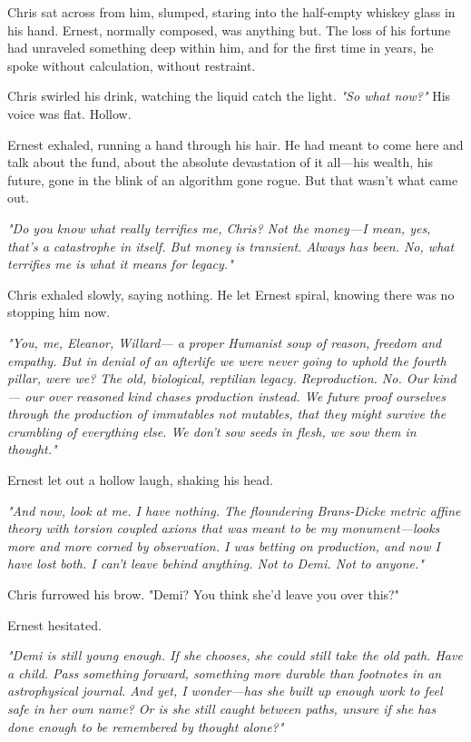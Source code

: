 Chris sat across from him, slumped, staring into the half-empty whiskey glass in his hand. Ernest, normally composed, was anything but. The loss of his fortune had unraveled something deep within him, and for the first time in years, he spoke without calculation, without restraint.

Chris swirled his drink, watching the liquid catch the light. \textit{"So what now?"} His voice was flat. Hollow.

Ernest exhaled, running a hand through his hair. He had meant to come here and talk about the fund, about the absolute devastation of it all—his wealth, his future, gone in the blink of an algorithm gone rogue. But that wasn’t what came out.

\textit{"Do you know what really terrifies me, Chris? Not the money—I mean, yes, that’s a catastrophe in itself. But money is transient. Always has been. No, what terrifies me is what it means for legacy."}

Chris exhaled slowly, saying nothing. He let Ernest spiral, knowing there was no stopping him now.

\textit{"You, me, Eleanor, Willard— a proper Humanist soup of reason, freedom and empathy. But in denial of an afterlife we were never going to uphold the fourth pillar, were we? The old, biological, reptilian legacy. Reproduction. No. Our kind— our over reasoned kind chases production instead. We future proof ourselves through the production of immutables not mutables, that they might survive the crumbling of everything else. We don't sow seeds in flesh, we sow them in thought."}

Ernest let out a hollow laugh, shaking his head.

\textit{"And now, look at me. I have nothing. The floundering Brans-Dicke metric affine theory with torsion coupled axions that was meant to be my monument—looks more and more corned by observation. I was betting on production, and now I have lost both. I can't leave behind anything. Not to Demi. Not to anyone."}

Chris furrowed his brow. "Demi? You think she’d leave you over this?"

Ernest hesitated.

\textit{"Demi is still young enough. If she chooses, she could still take the old path. Have a child. Pass something forward, something more durable than footnotes in an astrophysical journal. And yet, I wonder—has she built up enough work to feel safe in her own name? Or is she still caught between paths, unsure if she has done enough to be remembered by thought alone?"}

